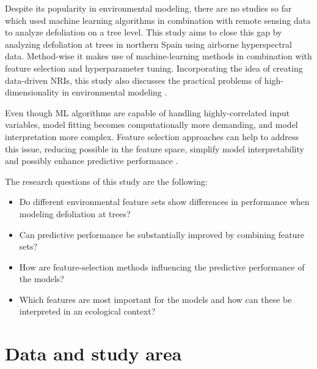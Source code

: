 \documentclass[letterpaper, peerreview, draftcls]{IEEEtran}
\begin{document}

Despite its popularity in environmental modeling, there are no studies so far which used machine learning algorithms in combination with remote sensing data to analyze defoliation on a tree level.
This study aims to close this gap by analyzing defoliation at trees in northern Spain using airborne hyperspectral data.
Method-wise it makes use of machine-learning methods in combination with feature selection and hyperparameter tuning.
Incorporating the idea of creating data-driven \ac{NRI}s, this study also discusses the practical problems of high-dimensionality in environmental modeling \cite{trunk1979, xu2016}.

Even though \ac{ML} algorithms are capable of handling highly-correlated input variables, model fitting becomes computationally more demanding, and model interpretation more complex.
Feature selection approaches can help to address this issue, reducing possible in the feature space, simplify model interpretability and possibly enhance predictive performance \cite{cai2018}.

The research questions of this study are the following:

\begin{itemize}

	\item Do different environmental feature sets show differences in performance when modeling defoliation at trees?
	      
	\item Can predictive performance be substantially improved by combining feature sets?
	      
	\item How are feature-selection methods influencing the predictive performance of the models?
	      
	\item Which features are most important for the models and how can these be interpreted in an ecological context?
	      
\end{itemize}

\section{Data and study area}
\end{document}
